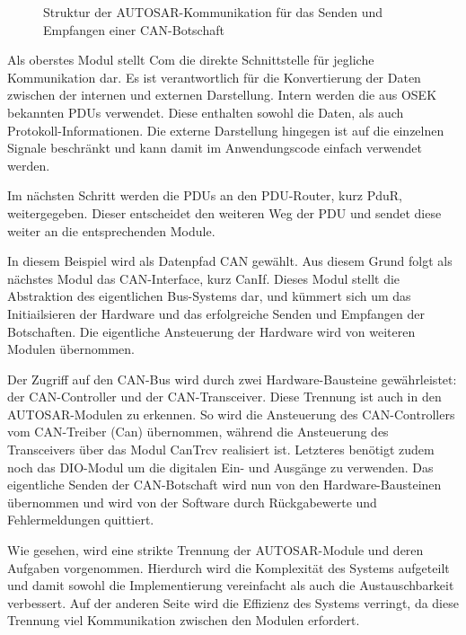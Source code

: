 \documentclass[
  a4paper,					    %
  twoside,
  DIV=calc,     				%
  bibliography=totoc,
  cleardoublepage=empty,
  ngerman,     					%
  final       					%
]{scrbook}
\begin{document}
\begin{figure}[tb]
    \centering
    
    \caption[Struktur der AUTOSAR-Kommunikation]{Struktur der AUTOSAR-Kommunikation für das Senden und Empfangen einer CAN-Botschaft}
    \label{fig:komm_beispiel}
\end{figure}

Als oberstes Modul stellt Com die direkte Schnittstelle für jegliche Kommunikation dar. Es ist verantwortlich für die Konvertierung der Daten zwischen der internen und externen Darstellung. Intern werden die aus OSEK bekannten PDUs verwendet. Diese enthalten sowohl die Daten, als auch Protokoll-Informationen. Die externe Darstellung hingegen ist auf die einzelnen Signale beschränkt und kann damit im Anwendungscode einfach verwendet werden.

Im nächsten Schritt werden die PDUs an den PDU-Router, kurz PduR, weitergegeben. Dieser entscheidet den weiteren Weg der PDU und sendet diese weiter an die entsprechenden Module.

In diesem Beispiel wird als Datenpfad CAN gewählt. Aus diesem Grund folgt als nächstes Modul das CAN-Interface, kurz CanIf. Dieses Modul stellt die Abstraktion des eigentlichen Bus-Systems dar, und kümmert sich um das Initiailsieren der Hardware und das erfolgreiche Senden und Empfangen der Botschaften. Die eigentliche Ansteuerung der Hardware wird von weiteren Modulen übernommen.

Der Zugriff auf den CAN-Bus wird durch zwei Hardware-Bausteine gewährleistet: der CAN-Controller und der CAN-Transceiver. Diese Trennung ist auch in den AUTOSAR-Modulen zu erkennen. So wird die Ansteuerung des CAN-Controllers vom CAN-Treiber (Can) übernommen, während die Ansteuerung des Transceivers über das Modul CanTrcv realisiert ist. Letzteres benötigt zudem noch das DIO-Modul um die digitalen Ein- und Ausgänge zu verwenden. Das eigentliche Senden der CAN-Botschaft wird nun von den Hardware-Bausteinen übernommen und wird von der Software durch Rückgabewerte und Fehlermeldungen quittiert.

Wie gesehen, wird eine strikte Trennung der AUTOSAR-Module und deren Aufgaben vorgenommen. Hierdurch wird die Komplexität des Systems aufgeteilt und damit sowohl die Implementierung vereinfacht als auch die Austauschbarkeit verbessert. Auf der anderen Seite wird die Effizienz des Systems verringt, da diese Trennung viel Kommunikation zwischen den Modulen erfordert.
\end{document}
